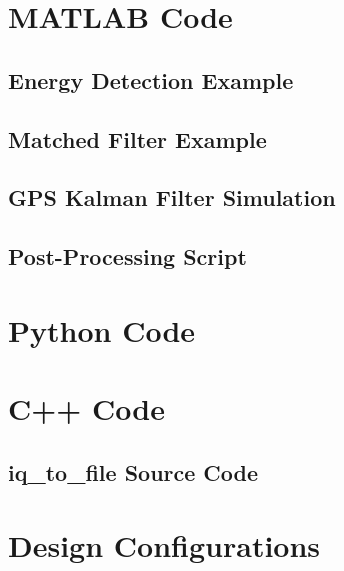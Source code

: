 \appendix
\chapter{MATLAB Code}

\section{Energy Detection Example}
\label{app:energy_detection}

\pagebreak

\section{Matched Filter Example}
\label{app:matched_filter}

\pagebreak

\section{GPS Kalman Filter Simulation}
\label{app:kf_sim}

\pagebreak

\section{Post-Processing Script}
\label{app:matlab_proc}

\pagebreak

\chapter{Python Code}
\chapter{C++ Code}
\section{iq\_to\_file Source Code}\label{app:iq_to_file}


\pagebreak
\chapter{Design Configurations}
